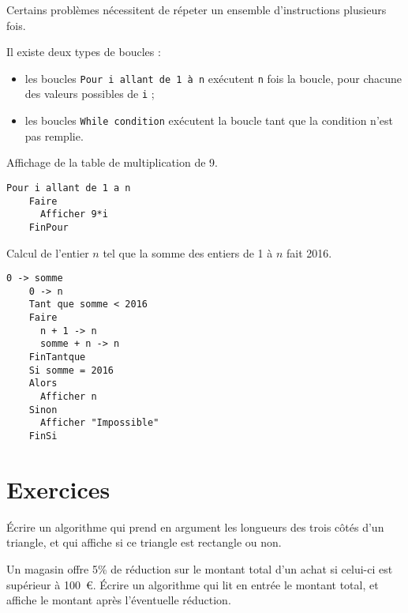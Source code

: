 \begin{multicols}{2}
Certains problèmes nécessitent de répeter un ensemble d'instructions plusieurs
fois.

Il existe deux types de boucles :
\begin{itemize}
  \item les boucles \texttt{Pour i allant de 1 à n} exécutent \texttt{n} fois la boucle, pour chacune des valeurs possibles de \texttt{i} ;
  \item les boucles \texttt{While condition} exécutent la boucle tant que la condition n'est pas remplie.
\end{itemize}

  \begin{exemple}Affichage de la table de multiplication de 9.
    \begin{lstlisting}[language=naturel,frame=lines,mathescape=true]
    Pour i allant de 1 a n
    Faire
      Afficher 9*i
    FinPour
    \end{lstlisting}
  \end{exemple}

  \columnbreak

  \begin{exemple}Calcul de l'entier $n$ tel que la somme des entiers de 1 à $n$
    fait 2016.
    \begin{lstlisting}[language=naturel,frame=lines,mathescape=true]
    0 -> somme
    0 -> n
    Tant que somme < 2016
    Faire
      n + 1 -> n
      somme + n -> n
    FinTantque
    Si somme = 2016
    Alors
      Afficher n
    Sinon
      Afficher "Impossible"
    FinSi
    \end{lstlisting}
  \end{exemple}
\end{multicols}

\section{Exercices}

\begin{exercice}
  Écrire un algorithme qui prend en argument les longueurs des trois côtés d'un
  triangle, et qui affiche si ce triangle est rectangle ou non.
\end{exercice}

\begin{exercice}
  Un magasin offre 5\% de réduction sur le montant total d'un achat si celui-ci
  est supérieur à 100~\euro. Écrire un algorithme qui lit en entrée le montant
  total, et affiche le montant après l'éventuelle réduction.
\end{exercice}

